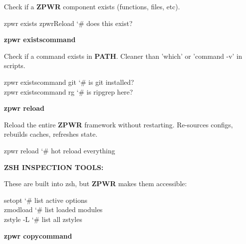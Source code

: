 \documentclass[11pt,a4paper,twoside]{book}
\begin{document}
Check if a \textbf{ZPWR} component exists (functions, files, etc).

\begin{codebox}
\color{neongreen}zpwr exists zpwrReload       {\char`\#} does this exist?\\
\end{codebox}


\vspace{12pt}
{\bfseries\color{neonyellow} zpwr existscommand}\vspace{4pt}

Check if a command exists in \textbf{PATH}. Cleaner than 'which' or 'command -v' in scripts.

\begin{codebox}
\color{neongreen}zpwr existscommand git      {\char`\#} is git installed?\\
\color{neongreen}zpwr existscommand rg       {\char`\#} is ripgrep here?\\
\end{codebox}


\vspace{12pt}
{\bfseries\color{neonyellow} zpwr reload}\vspace{4pt}

Reload the entire \textbf{ZPWR} framework without restarting. Re-sources configs, rebuilds caches, refreshes state.

\begin{codebox}
\color{neongreen}zpwr reload                 {\char`\#} hot reload everything\\
\end{codebox}


\vspace{12pt}
{\bfseries\color{neonyellow} ZSH INSPECTION TOOLS:}\vspace{4pt}

These are built into zsh, but \textbf{ZPWR} makes them accessible:

\begin{codebox}
\color{neongreen}setopt                      {\char`\#} list active options\\
\color{neongreen}zmodload                    {\char`\#} list loaded modules\\
\color{neongreen}zstyle -L                   {\char`\#} list all zstyles\\
\end{codebox}


\vspace{12pt}
{\bfseries\color{neonyellow} zpwr copycommand}\vspace{4pt}
\end{document}
